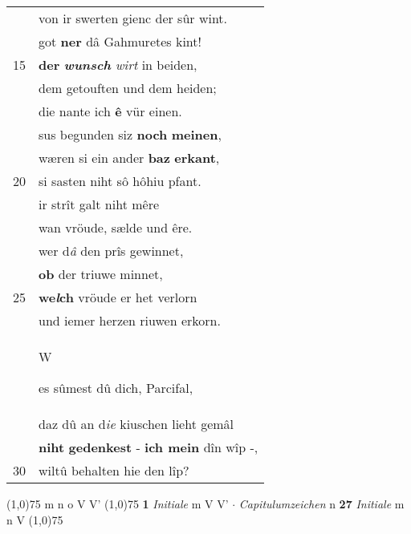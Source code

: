 \documentclass[8pt,a4paper,notitlepage]{article}
\begin{document}
\begin{table}[ht]
\begin{minipage}[t]{0.5\linewidth}
\begin{tabular}{rl}
 & von ir swerten gienc der sûr wint.\\ 
 & got \textbf{ner} dâ Gahmuretes kint!\\ 
15 & \textbf{der} \textit{\textbf{wunsch} wirt} in beiden,\\ 
 & dem getouften und dem heiden;\\ 
 & die nante ich \textbf{ê} vür einen.\\ 
 & sus begunden siz \textbf{noch} \textbf{meinen},\\ 
 & wæren si ein ander \textbf{baz} \textbf{erkant},\\ 
20 & si sasten niht sô hôhiu pfant.\\ 
 & ir strît galt niht mêre\\ 
 & wan vröude, sælde und êre.\\ 
 & wer d\textit{â} den prîs gewinnet,\\ 
 & \textbf{ob} der triuwe minnet,\\ 
25 & \textbf{we\textit{l}ch} vröude er het verlorn\\ 
 & und iemer herzen riuwen erkorn.\\ 
 & \begin{large}W\end{large}es sûmest dû dich, Parcifal,\\ 
 & daz dû an d\textit{ie} kiuschen lieht gemâl\\ 
 & \textbf{niht} \textbf{gedenkest} - \textbf{ich mein} dîn wîp -,\\ 
30 & wiltû behalten hie den lîp?\\ 
\end{tabular}
\scriptsize
\line(1,0){75} \newline
m n o V V' \newline
\line(1,0){75} \newline
\textbf{1} \textit{Initiale} m V V'   $\cdot$ \textit{Capitulumzeichen} n  \textbf{27} \textit{Initiale} m n V  \newline
\line(1,0){75} \newline

\end{minipage}
\end{table}
\end{document}
